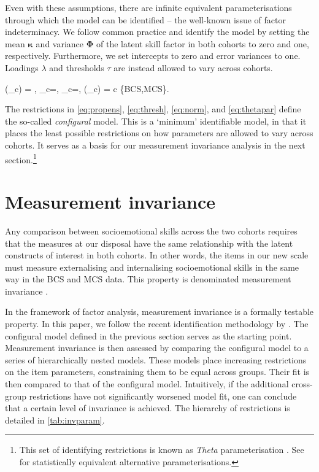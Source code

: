 Even with these assumptions, there are infinite equivalent parameterisations through which the model can be identified -- the well-known issue of factor indeterminacy. We follow common practice and identify the model by setting the mean $\bm{\kappa}$ and variance $\bm{\Phi}$ of the latent skill factor in both cohorts to zero and one, respectively. Furthermore, we set intercepts to zero and error variances to one. Loadings $\lambda$ and thresholds $\tau$ are instead allowed to vary across cohorts.

\be\label{eq:thetapar}
(\bm{\Phi}_c) = , \quad \bm{\kappa}_c=, \quad \bm{\nu}_c=, \quad {} \; (\bm{\Psi}_c) =  \qquad \forall c \in \{BCS,MCS\}.
\ee

The restrictions in \eqref{eq:propens}, \eqref{eq:thresh}, \eqref{eq:norm}, and \eqref{eq:thetapar} define the so-called \emph{configural} model. This is a `minimum' identifiable model, in that it places the least possible restrictions on how parameters are allowed to vary across cohorts. It serves as a basis for our measurement invariance analysis in the next section.\footnote{This set of identifying restrictions is known as \emph{Theta} parameterisation \citep{Wu2016a}. See  for statistically equivalent alternative parameterisations.}

\section{Measurement invariance \label{sec:measinv}}

Any comparison between socioemotional skills across the two cohorts requires that the measures at our disposal have the same relationship with the latent constructs of interest in both cohorts. In other words, the items in our new scale must measure externalising and internalising socioemotional skills in the same way in the BCS and MCS data. This property is denominated measurement invariance \citep{Vandenberg2000a,Putnick2016}.

In the framework of factor analysis, measurement invariance is a formally testable property. In this paper, we follow the recent identification methodology by \cite{Wu2016a}. The configural model defined in the previous section serves as the starting point. Measurement invariance is then assessed by comparing the configural model to a series of hierarchically nested models. These models place increasing restrictions on the item parameters, constraining them to be equal across groups. Their fit is then compared to that of the configural model. Intuitively, if the additional cross-group restrictions have not significantly worsened model fit, one can conclude that a certain level of invariance is achieved. The hierarchy of restrictions is detailed in \autoref{tab:invparam}.

